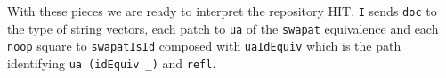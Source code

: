 \begin{code}
\AgdaOperator{\AgdaFunction{]\%=}}\AgdaSpace{}%
\AgdaSpace{}%
\AgdaSymbol{)}\AgdaSpace{}%
\AgdaSpace{}%
\<%
\\
\>[.][@{}l@{}]\<[727I]%
\>[18]\AgdaSpace{}%
\AgdaOperator{\AgdaFunction{[}}\AgdaSpace{}%
\AgdaSpace{}%
\AgdaOperator{\AgdaFunction{]\%=}}\AgdaSpace{}%
%
\>[48]\AgdaSpace{}%
\AgdaSpace{}%
\<%
\\
%
\>[18]\AgdaSpace{}%
\AgdaSpace{}%
\<%
\\
%
\\[\AgdaEmptyExtraSkip]%
\>[0]\AgdaSpace{}%
\AgdaSymbol{:}\AgdaSpace{}%
\AgdaSymbol{\{}\AgdaSpace{}%
\AgdaSymbol{:}\AgdaSpace{}%
\AgdaSymbol{\}}\AgdaSpace{}%
\AgdaSymbol{\{}\AgdaSpace{}%
\AgdaSymbol{:}\AgdaSpace{}%
\AgdaSpace{}%
\AgdaSymbol{\}}\AgdaSpace{}%
\AgdaSpace{}%
\AgdaSpace{}%
\AgdaSymbol{(}\AgdaSpace{}%
\AgdaOperator{\AgdaInductiveConstructor{,}}\AgdaSpace{}%
\AgdaSymbol{)}\AgdaSpace{}%
\AgdaSpace{}%
\AgdaSpace{}%
\AgdaSpace{}%
\<%
\\
\>[0]\AgdaSpace{}%
\AgdaSymbol{=}\AgdaSpace{}%
\AgdaSpace{}%
\<%
\end{code}

With these pieces we are ready to interpret the repository HIT.
\texttt{I} sends \texttt{doc} to the type of string vectors, each patch to \texttt{ua} of the
\texttt{swapat} equivalence and each \texttt{noop} square to \texttt{swapatIsId} composed with
\texttt{uaIdEquiv} which is the path identifying \texttt{ua (idEquiv \_)} and \texttt{refl}.

